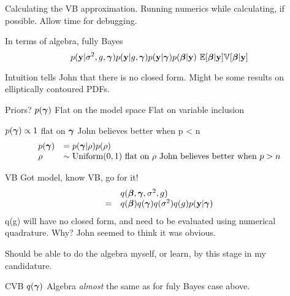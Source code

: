\documentclass{amsart}
\begin{document}
Calculating the VB approximation.
Running numerics while calculating, if possible.
Allow time for debugging.

In terms of algebra, fully Bayes
\begin{equation*}
p({\bf y} | \sigma^2, g, {\boldsymbol \gamma})
p({\bf y} | g, {\boldsymbol \gamma})
p({\bf y} | {\boldsymbol \gamma})
p({\boldsymbol \beta} | {\bf y}) \
{\mathbb E}[{\boldsymbol \beta} | {\bf y}]
{\mathbb V}[{\boldsymbol \beta} | {\bf y}]
\end{equation*}

Intuition tells John that there is no closed form. Might be some results on elliptically contoured PDFs.

Priors?
$p({\boldsymbol \gamma})$ Flat on the model space
Flat on variable inclusion

$p({\boldsymbol \gamma}) \propto 1$ flat on ${\boldsymbol \gamma}$ John believes better when p < n
\begin{equation*}
\begin{array}{ll}
p({\boldsymbol \gamma}) &= p({\boldsymbol \gamma} | \rho) p(\rho) \\
\rho &\sim \text{Uniform}(0, 1) \text{ flat on $\rho$ John believes better when $p > n$}
\end{array}
\end{equation*}

VB Got model, know VB, go for it!
\begin{equation*}
\begin{array}{ll}
&q({\boldsymbol \beta}, {\boldsymbol \gamma}, \sigma^2, g) \\
= &q({\boldsymbol \beta}) q({\boldsymbol \gamma}) q(\sigma^2) q(g) p({\bf y} | {\boldsymbol \gamma})
\end{array}
\end{equation*}
q(g) will have no closed form, and need to be evaluated using numerical quadrature. Why? John seemed to think
it was obvious.

Should be able to do the algebra myself, or learn, by this stage in my candidature.

CVB $q({\boldsymbol \gamma})$
Algebra \emph{almost} the same as for fuly Bayes case above.
\end{document}

